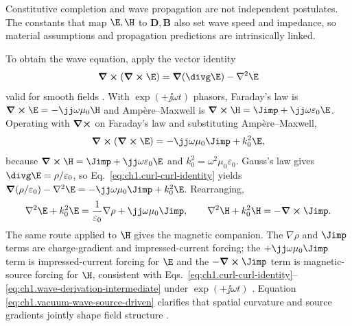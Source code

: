 Constitutive completion and wave propagation are not independent postulates. The constants
that map \(\E,\H\) to \(\mathbf{D},\mathbf{B}\) also set wave speed and impedance,
so material assumptions and propagation predictions are intrinsically linked.

To obtain the wave equation, apply the vector identity
\begin{equation}
\label{eq:ch1.curl-curl-identity}
\curl(\curl\E)=\grad(\divg\E)-\nabla^2\E
\end{equation}
valid for smooth fields \cite{stratton1941}. With $\exp(+\jj\omega t)$ phasors, Faraday's law is $\curl\E=-\jj\omega\mu_0\H$ and Amp\`ere--Maxwell is $\curl\H=\Jimp+\jj\omega\varepsilon_0\E$. Operating with $\curl$ on Faraday's law and substituting Amp\`ere--Maxwell,
\begin{equation}
\label{eq:ch1.wave-derivation-intermediate}
\curl(\curl\E)=-\jj\omega\mu_0\Jimp+k_0^2\E,
\end{equation}
because $\curl\H=\Jimp+\jj\omega\varepsilon_0\E$ and $k_0^2=\omega^2\mu_0\varepsilon_0$. Gauss's law gives $\divg\E=\rho/\varepsilon_0$, so Eq.~\eqref{eq:ch1.curl-curl-identity} yields
$\grad(\rho/\varepsilon_0)-\nabla^2\E=-\jj\omega\mu_0\Jimp+k_0^2\E$.
Rearranging,
\begin{equation}
\label{eq:ch1.vacuum-wave-source-driven}
\nabla^2\E+k_0^2\E=\frac{1}{\varepsilon_0}\nabla\rho+\jj\omega\mu_0\Jimp,\qquad
\nabla^2\H+k_0^2\H=-\curl\Jimp.
\end{equation}
The same route applied to $\H$ gives the magnetic companion. The $\nabla\rho$ and $\Jimp$ terms are charge-gradient and impressed-current forcing; the
$+\jj\omega\mu_0\Jimp$ term is impressed-current forcing for $\E$ and the
$- \curl\Jimp$ term is magnetic-source forcing for $\H$, consistent with
Eqs.~\eqref{eq:ch1.curl-curl-identity}--\eqref{eq:ch1.wave-derivation-intermediate}
under $\exp(+\jj\omega t)$ \cite{jackson1999,stratton1941}. Equation
\eqref{eq:ch1.vacuum-wave-source-driven} clarifies that spatial curvature and
source gradients jointly shape field structure \cite{stratton1941}.

